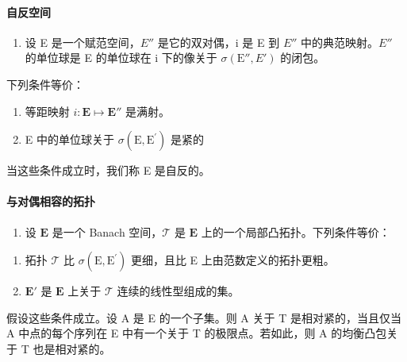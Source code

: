 \paragraph{自反空间}

\begin{enumerate}
\def\labelenumi{\arabic{enumi})}
\setcounter{enumi}{21}
\tightlist
\item
   设 E 是一个赋范空间，\(E''\) 是它的双对偶，i 是 E 到 \(E''\) 中的典范映射。\(E''\) 的单位球是 E 的单位球在 i 下的像关于 \(\sigma(\mathrm{E}'', E')\) 的闭包。
\end{enumerate}

下列条件等价：

\begin{enumerate}
\def\labelenumi{(\roman{enumi})}
\item
  等距映射 \(i:\mathbf{E}\mapsto \mathbf{E}''\) 是满射。
\item
  E 中的单位球关于 \(\sigma (\mathrm{E},\mathrm{E}^{\prime})\) 是紧的
\end{enumerate}

当这些条件成立时，我们称 E 是自反的。

\paragraph{与对偶相容的拓扑}

\begin{enumerate}
\def\labelenumi{\arabic{enumi})}
\setcounter{enumi}{22}
\tightlist
\item
  设 \(\mathbf{E}\) 是一个 Banach 空间，\(\mathcal{T}\) 是 \(\mathbf{E}\) 上的一个局部凸拓扑。下列条件等价：
\end{enumerate}

\begin{enumerate}
\def\labelenumi{(\roman{enumi})}
\item
  拓扑 \(\mathcal{T}\) 比 \(\sigma (\mathrm{E},\mathrm{E}^{\prime})\) 更细，且比 E 上由范数定义的拓扑更粗。
\item
  \(\mathbf{E}'\) 是 \(\mathbf{E}\) 上关于 \(\mathcal{T}\) 连续的线性型组成的集。
\end{enumerate}

假设这些条件成立。设 A 是 E 的一个子集。则 A 关于 T 是相对紧的，当且仅当 A 中点的每个序列在 E 中有一个关于 T 的极限点。若如此，则 A 的均衡凸包关于 T 也是相对紧的。


